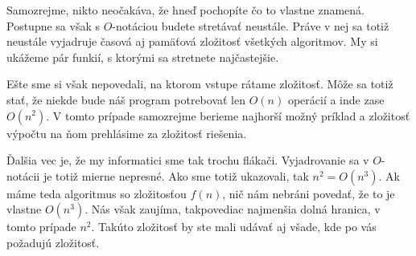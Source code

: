 
Samozrejme, nikto neočakáva, že hneď pochopíte čo to vlastne znamená. Postupne sa však s
$O$-notáciou budete stretávať neustále. Práve v nej sa totiž neustále vyjadruje časová aj pamäťová
zložitosť všetkých algoritmov. My si ukážeme pár funkií, s ktorými sa stretnete najčastejšie.

Ešte sme si však nepovedali, na ktorom vstupe rátame zložitosť. Môže sa totiž stať, že niekde bude
náš program potrebovať len $O(n)$ operácií a inde zase $O(n^2)$. V tomto prípade samozrejme berieme
najhorší možný príklad a zložitosť výpočtu na ňom prehlásime za zložitosť riešenia.

Ďalšia vec je, že my informatici sme tak trochu flákači. Vyjadrovanie sa v $O$-notácii je totiž
mierne nepresné. Ako sme totiž ukazovali, tak $n^2 = O(n^3)$. Ak máme teda algoritmus so zložitosťou
$f(n)$, nič nám nebráni povedať, že to je vlastne $O(n^3)$. Nás však zaujíma, takpovediac najmenšia
dolná hranica, v tomto prípade $n^2$. Takúto zložitosť by ste mali udávať aj všade, kde po vás
požadujú zložitosť.



